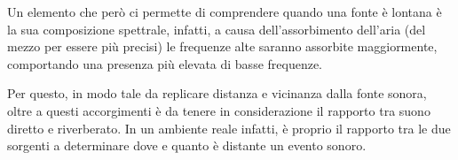 Un elemento che però ci permette di comprendere quando una fonte è lontana è la sua composizione spettrale, infatti, a causa dell’assorbimento dell’aria (del mezzo per essere più precisi) le frequenze alte saranno assorbite maggiormente, comportando una presenza più elevata di basse frequenze.

Per questo, in modo tale da replicare distanza e vicinanza dalla fonte sonora, oltre a questi accorgimenti è da tenere in considerazione il rapporto tra suono diretto e riverberato.
In un ambiente reale infatti, è proprio il rapporto tra le due sorgenti a determinare dove e quanto è distante un evento sonoro.

